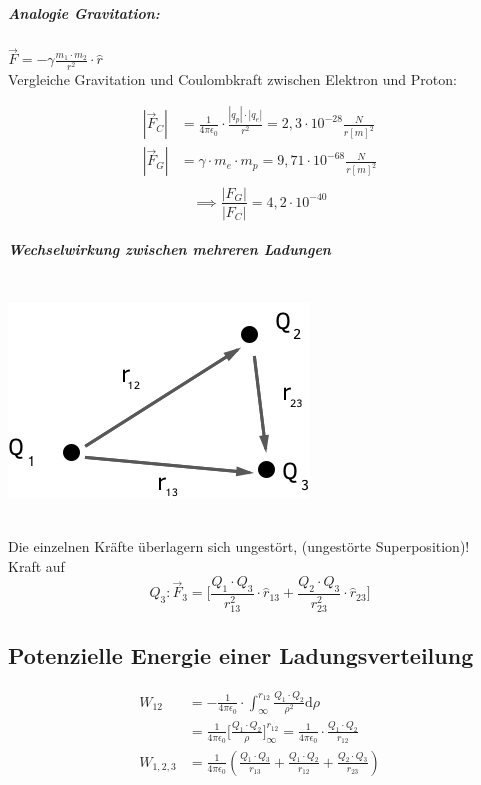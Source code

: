 \documentclass[11pt]{article}
\begin{document}
\hfill\\

\noindent{}

\subparagraph{Analogie Gravitation:} $\vec{F} = -\gamma\frac{m_1\cdot m_2}{r^2}\cdot\hat r$\\

Vergleiche Gravitation und Coulombkraft zwischen Elektron und Proton:

\begin{align*}
|\vec{F}_C| &= \frac{1}{4\pi\epsilon_0}\cdot\frac{|q_p|\cdot|q_e|}{r^2}= 2,3\cdot10^{ -28 } \frac{N}{r[m]^2}\\
|\vec{F}_G| &= \gamma\cdot m_e\cdot m_p  = 9,71\cdot10^{-68} \frac{N}{r[m]^2}\\
\end{align*}
$$ \implies \frac{|F_G|}{|F_C|} = 4,2\cdot10^{-40} $$

\subparagraph{Wechselwirkung zwischen mehreren Ladungen}

\hfill\\

\includegraphics{skizzen/14/14_2B1}

\hfill\\

Die einzelnen Kräfte überlagern sich ungestört, (ungestörte Superposition)!\\

Kraft auf $$ Q_3: \vec{F}_3 = \bigg[\frac{Q_1\cdot Q_3}{r^2_{13}}\cdot\hat{r}_{13}+\frac{Q_2\cdot Q_3}{r^2_{23}}\cdot\hat{r}_{23}\bigg]$$ 


\subsection{Potenzielle Energie einer Ladungsverteilung}


\begin{align*}
\displaystyle W_{12} &= -\frac{1}{4\pi\epsilon_0}\cdot\int_{\infty}^{r_{12}} \frac{Q_1\cdot Q_2}{\rho^2}  \mathrm{d}\rho\\
&=\frac{1}{4\pi\epsilon_0} \big[\frac{Q_1\cdot Q_2}{\rho}\big]^{r_{12}}_\infty = \frac{1}{4\pi\epsilon_0}\cdot \frac{Q_1\cdot Q_2}{r_{12}}\\
W_{1,2,3} &= \frac{1}{4\pi\epsilon_0}(\frac{Q_1\cdot Q_3}{r_{13}}+\frac{Q_1\cdot Q_2}{r_{12}}+\frac{Q_2\cdot Q_3}{r_{23}})
\end{align*}\\
\end{document}
